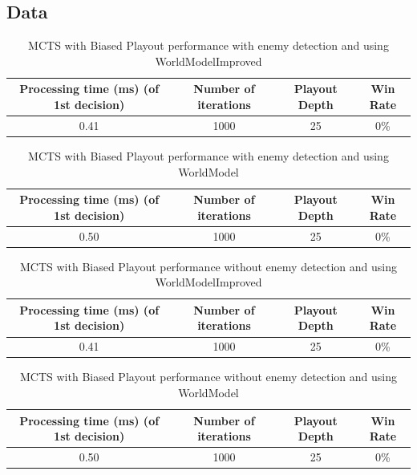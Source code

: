 \documentclass{article}
\begin{document}
  \subsection{Data}
  \begin{table}[h!]
    \centering
    \caption{MCTS with Biased Playout performance with enemy detection and using WorldModelImproved}
    \label{tab:tableBiasedMCTS1}
    \begin{tabular}{c|c|c|c}
      \textbf{Processing time (ms) (of 1st decision)} & \textbf{Number of iterations} & \textbf{Playout Depth} & \textbf{Win Rate}\\
      \hline
      0.41 & 1000 & 25 & 0\%
    \end{tabular}
  \end{table}
  \begin{table}[h!]
    \centering
    \caption{MCTS with Biased Playout performance with enemy detection and using WorldModel}
    \label{tab:tableBiasedMCTS2}
    \begin{tabular}{c|c|c|c}
      \textbf{Processing time (ms) (of 1st decision)} & \textbf{Number of iterations} & \textbf{Playout Depth} & \textbf{Win Rate}\\
      \hline
      0.50 & 1000 & 25 & 0\%
    \end{tabular}
  \end{table}
  \begin{table}[h!]
    \centering
    \caption{MCTS with Biased Playout performance without enemy detection and using WorldModelImproved}
    \label{tab:tableBiasedMCTS3}
    \begin{tabular}{c|c|c|c}
      \textbf{Processing time (ms) (of 1st decision)} & \textbf{Number of iterations} & \textbf{Playout Depth} & \textbf{Win Rate}\\
      \hline
      0.41 & 1000 & 25 & 0\%
    \end{tabular}
  \end{table}
  \begin{table}[h!]
    \centering
    \caption{MCTS with Biased Playout performance without enemy detection and using WorldModel}
    \label{tab:tableBiasedMCTS4}
    \begin{tabular}{c|c|c|c}
      \textbf{Processing time (ms) (of 1st decision)} & \textbf{Number of iterations} & \textbf{Playout Depth} & \textbf{Win Rate}\\
      \hline
      0.50 & 1000 & 25 & 0\%
    \end{tabular}
  \end{table}
\end{document}
